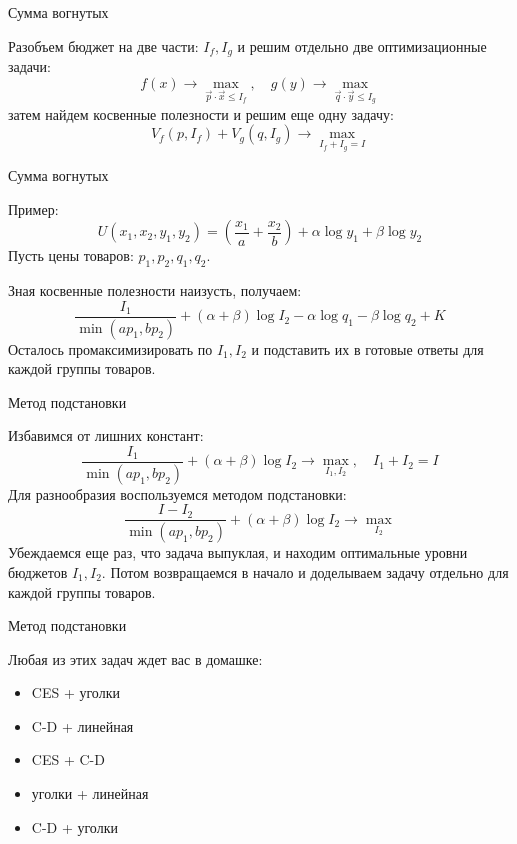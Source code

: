 \documentclass{beamer}
\begin{document}
\begin{frame}{Сумма вогнутых}

Разобъем бюджет на две части: $I_f, I_g$ и решим отдельно две оптимизационные задачи:
$$f(x) \to \max_{\vec p \cdot \vec x \leqslant I_f}, \quad g(y) \to \max_{\vec q \cdot \vec y \leqslant I_g}$$
затем найдем косвенные полезности и решим еще одну задачу:
$$V_f(p,I_f) + V_g(q,I_g) \to \max_{I_f + I_g = I} $$

\end{frame}

\begin{frame}{Сумма вогнутых}

Пример:
$$ U(x_1,x_2, y_1,y_2) =(\frac{x_1}{a} + \frac{x_2}{b}) + \alpha \log y_1 + \beta \log y_2$$
Пусть цены товаров: $p_1, p_2, q_1, q_2$.

Зная косвенные полезности наизусть, получаем:
$$ \frac{I_1}{\min(a p_1, b p_2)} + (\alpha + \beta) \log I_2 - \alpha \log q_1 - \beta \log q_2 + K$$
Осталось промаксимизировать по $I_1, I_2$ и подставить их в готовые ответы для каждой группы товаров.
\end{frame}

\begin{frame}{Метод подстановки}

Избавимся от лишних констант:
$$ \frac{I_1}{\min(a p_1, b p_2)} + (\alpha + \beta) \log I_2 \to \max_{I_1,I_2}, \quad I_1 + I_2 = I$$
Для разнообразия воспользуемся \alert{методом подстановки}:
$$ \frac{I-I_2}{\min(a p_1, b p_2)} + (\alpha + \beta) \log I_2 \to \max_{I_2}$$
Убеждаемся еще раз, что задача выпуклая, и находим оптимальные уровни бюджетов $I_1, I_2$. Потом возвращаемся в начало и доделываем задачу отдельно для каждой группы товаров.
\end{frame}

\begin{frame}{Метод подстановки}

Любая из этих задач ждет вас в домашке:

\begin{itemize}
  \item CES + уголки
  \item C-D + линейная
  \item CES + C-D
  \item уголки + линейная
  \item C-D + уголки
\end{itemize}

\end{frame}
\end{document}
